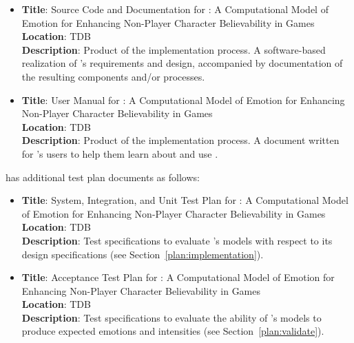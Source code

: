 \begin{itemize}
    \item \textbf{Title}: Source Code and Documentation for \progname{}: A
    Computational Model of Emotion for Enhancing Non-Player Character
    Believability in Games \\
    \textbf{Location}: TDB \\
    \textbf{Description}: Product of the implementation process. A
    software-based realization of \progname{}'s requirements and design,
    accompanied by documentation of the resulting components and/or processes.

    \item \textbf{Title}: User Manual for \progname{}: A Computational Model
    of Emotion for Enhancing Non-Player Character Believability in Games \\
    \textbf{Location}: TDB \\
    \textbf{Description}: Product of the implementation process. A document
    written for \progname{}'s users to help them learn about and use
    \progname{}.

\end{itemize}

\noindent \progname{} has additional test plan documents as follows:
\begin{itemize}

    \item \textbf{Title}: System, Integration, and Unit Test Plan for
    \progname{}: A Computational Model of Emotion for Enhancing Non-Player
    Character Believability in Games \\
    \textbf{Location}: TDB \\
    \textbf{Description}: Test specifications to evaluate \progname{}'s models
    with respect to its design specifications (see
    Section~\ref{plan:implementation}).

    \clearpage\item \textbf{Title}: Acceptance Test Plan for \progname{}: A
    Computational Model of Emotion for Enhancing Non-Player Character
    Believability in Games \\
    \textbf{Location}: TDB \\
    \textbf{Description}: Test specifications to evaluate the ability of
    \progname{}'s models to produce expected emotions and intensities (see
    Section~\ref{plan:validate}).

\end{itemize}

